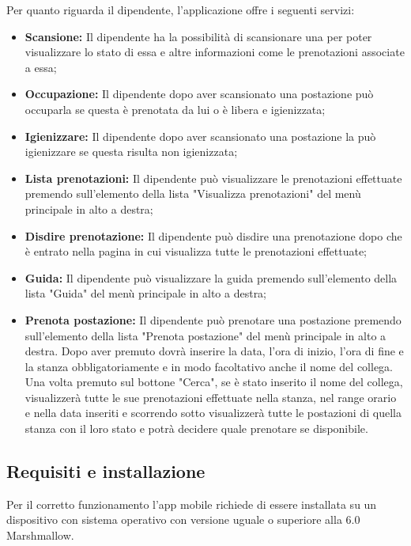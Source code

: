 Per quanto riguarda il dipendente, l'applicazione offre i seguenti servizi:
\begin{itemize}
	\item \textbf{Scansione:} Il dipendente ha la possibilità di scansionare una  per poter visualizzare lo stato di essa e altre informazioni come le prenotazioni associate a essa; \\
	\item \textbf{Occupazione:} Il dipendente dopo aver scansionato una postazione può occuparla se questa è prenotata da lui o è libera e igienizzata; \\
	\item \textbf{Igienizzare:} Il dipendente dopo aver scansionato una postazione la può igienizzare se questa risulta non igienizzata; \\
	\item \textbf{Lista prenotazioni:} Il dipendente può visualizzare le prenotazioni effettuate premendo sull'elemento della lista "Visualizza prenotazioni" del menù principale in alto a destra; \\
	\item \textbf{Disdire prenotazione:} Il dipendente può disdire una prenotazione dopo che è entrato nella pagina in cui visualizza tutte le prenotazioni effettuate; \\
	\item \textbf{Guida:} Il dipendente può visualizzare la guida premendo sull'elemento della lista "Guida" del menù principale in alto a destra; \\
	\item \textbf{Prenota postazione:} Il dipendente può prenotare una postazione premendo sull'elemento della lista "Prenota postazione" del menù principale in alto a destra.
	Dopo aver premuto dovrà inserire la data, l'ora di inizio, l'ora di fine e la stanza obbligatoriamente e in modo facoltativo anche il nome del collega.
	Una volta premuto sul bottone "Cerca", se è stato inserito il nome del collega, visualizzerà tutte le sue prenotazioni effettuate nella stanza, nel range orario e nella data inseriti e scorrendo sotto visualizzerà tutte le postazioni di quella stanza con il loro stato e potrà decidere quale prenotare se disponibile. \\	
\end{itemize}

\subsection{Requisiti e installazione}
	Per il corretto funzionamento l'app mobile richiede di essere installata su un dispositivo con sistema operativo  con versione uguale o superiore alla 6.0 Marshmallow.
	
